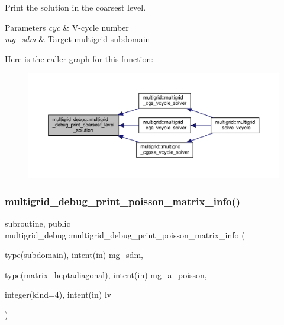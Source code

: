 Print the solution in the coarsest level. 


\begin{DoxyParams}{Parameters}
{\em cyc} & V-\/cycle number \\
\hline
{\em mg\+\_\+sdm} & Target multigrid subdomain \\
\hline
\end{DoxyParams}
Here is the caller graph for this function\+:
\nopagebreak
\begin{figure}[H]
\begin{center}
\leavevmode
\includegraphics[width=350pt]{namespacemultigrid__debug_ad5c036138c7fd5e103641a667a88e6cf_icgraph}
\end{center}
\end{figure}
\mbox{\label{namespacemultigrid__debug_aae55d6fc6a22d97825619d5bb58a1b88}} 
\subsubsection{\texorpdfstring{multigrid\+\_\+debug\+\_\+print\+\_\+poisson\+\_\+matrix\+\_\+info()}{multigrid\_debug\_print\_poisson\_matrix\_info()}}
{\footnotesize\ttfamily subroutine, public multigrid\+\_\+debug\+::multigrid\+\_\+debug\+\_\+print\+\_\+poisson\+\_\+matrix\+\_\+info (\begin{DoxyParamCaption}\item[{type(\hyperlink{structgeometry_1_1subdomain}{subdomain}), intent(in)}]{mg\+\_\+sdm,  }\item[{type(\hyperlink{structmatrix_1_1matrix__heptadiagonal}{matrix\+\_\+heptadiagonal}), intent(in)}]{mg\+\_\+a\+\_\+poisson,  }\item[{integer(kind=4), intent(in)}]{lv }\end{DoxyParamCaption})}



